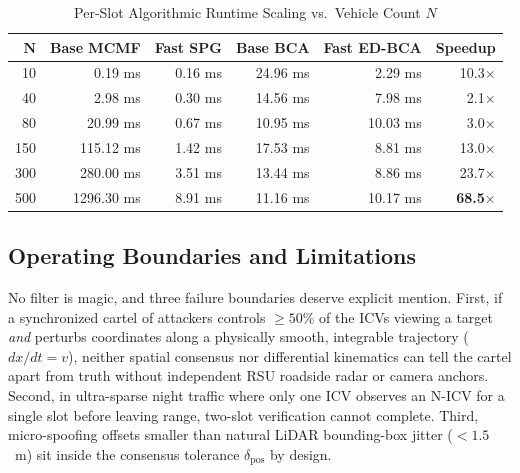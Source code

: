 \documentclass[conference]{IEEEtran}
\begin{document}
\begin{table}[t]
\caption{Per-Slot Algorithmic Runtime Scaling vs.\ Vehicle Count $N$}
\begin{center}
\footnotesize
\begin{tabular}{rrrrrr}
\toprule
$\boldsymbol{N}$ & \textbf{Base MCMF} & \textbf{Fast SPG} & \textbf{Base BCA} & \textbf{Fast ED-BCA} & \textbf{Speedup}\\
\midrule
10  & 0.19 ms    & 0.16 ms & 24.96 ms & 2.29 ms  & 10.3$\times$\\
40  & 2.98 ms    & 0.30 ms & 14.56 ms & 7.98 ms  & 2.1$\times$\\
80  & 20.99 ms   & 0.67 ms & 10.95 ms & 10.03 ms & 3.0$\times$\\
150 & 115.12 ms  & 1.42 ms & 17.53 ms & 8.81 ms  & 13.0$\times$\\
300 & 280.00 ms  & 3.51 ms & 13.44 ms & 8.86 ms  & 23.7$\times$\\
500 & 1296.30 ms & 8.91 ms & 11.16 ms & 10.17 ms & \textbf{68.5$\times$}\\
\bottomrule
\end{tabular}
\label{tab:scalability}
\end{center}
\end{table}

\subsection{Operating Boundaries and Limitations}
No filter is magic, and three failure boundaries deserve explicit mention. First, if a synchronized cartel of attackers controls $\ge 50\%$ of the ICVs viewing a target \emph{and} perturbs coordinates along a physically smooth, integrable trajectory ($dx/dt = v$), neither spatial consensus nor differential kinematics can tell the cartel apart from truth without independent RSU roadside radar or camera anchors. Second, in ultra-sparse night traffic where only one ICV observes an N-ICV for a single slot before leaving range, two-slot verification cannot complete. Third, micro-spoofing offsets smaller than natural LiDAR bounding-box jitter ($<1.5$~m) sit inside the consensus tolerance $\delta_{\mathrm{pos}}$ by design.

\end{document}
